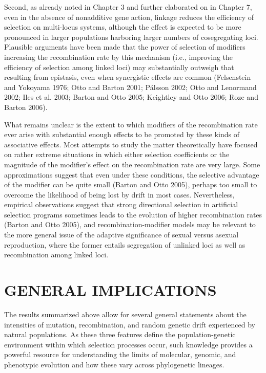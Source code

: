 \documentclass{article}
\begin{document}
Second, as already noted in Chapter 3 and further elaborated on in Chapter 7, even in the absence of nonadditive gene action, linkage reduces the efficiency of selection on multi-locus systems, although the effect is expected to be more pronounced in larger populations harboring larger numbers of cosegregating loci. Plausible arguments have been made that the power of selection of modifiers increasing the recombination rate by this mechanism (i.e., improving the efficiency of selection among linked loci) may substantially outweigh that resulting from epistasis, even when synergistic effects are common (Felsenstein and Yokoyama 1976; Otto and Barton 2001; Pálsson 2002; Otto and Lenormand 2002; Iles et al. 2003; Barton and Otto 2005; Keightley and Otto 2006; Roze and Barton 2006).

What remains unclear is the extent to which modifiers of the recombination rate ever arise with substantial enough effects to be promoted by these kinds of associative effects. Most attempts to study the matter theoretically have focused on rather extreme situations in which either selection coefficients or the magnitude of the modifier's effect on the recombination rate are very large. Some approximations suggest that even under these conditions, the selective advantage of the modifier can be quite small (Barton and Otto 2005), perhaps too small to overcome the likelihood of being lost by drift in most cases. Nevertheless, empirical observations suggest that strong directional selection in artificial selection programs sometimes leads to the evolution of higher recombination rates (Barton and Otto 2005), and recombination-modifier models may be relevant to the more general issue of the adaptive significance of sexual versus asexual reproduction, where the former entails segregation of unlinked loci as well as recombination among linked loci.

\section{GENERAL IMPLICATIONS}
The results summarized above allow for several general statements about the intensities of mutation, recombination, and random genetic drift experienced by natural populations. As these three features define the population-genetic environment within which selection processes occur, such knowledge provides a powerful resource for understanding the limits of molecular, genomic, and phenotypic evolution and how these vary across phylogenetic lineages.
\end{document}
